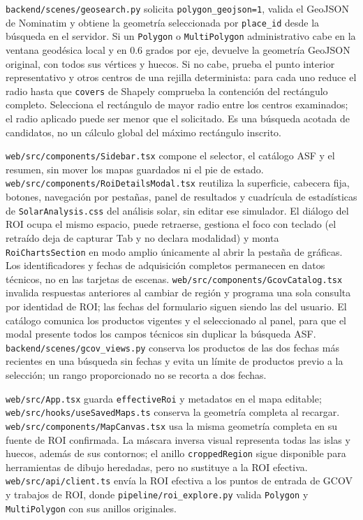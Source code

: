 \documentclass[11pt]{article}
\begin{document}
\texttt{backend/scenes/geosearch.py} solicita \texttt{polygon\_geojson=1}, valida el GeoJSON de Nominatim y obtiene la geometría seleccionada por \texttt{place\_id} desde la búsqueda en el servidor. Si un \texttt{Polygon} o \texttt{MultiPolygon} administrativo cabe en la ventana geodésica local y en 0.6 grados por eje, devuelve la geometría GeoJSON original, con todos sus vértices y huecos. Si no cabe, prueba el punto interior representativo y otros centros de una rejilla determinista: para cada uno reduce el radio hasta que \texttt{covers} de Shapely comprueba la contención del rectángulo completo. Selecciona el rectángulo de mayor radio entre los centros examinados; el radio aplicado puede ser menor que el solicitado. Es una búsqueda acotada de candidatos, no un cálculo global del máximo rectángulo inscrito.

\texttt{web/src/components/Sidebar.tsx} compone el selector, el catálogo ASF y el resumen, sin mover los mapas guardados ni el pie de estado. \texttt{web/src/components/RoiDetailsModal.tsx} reutiliza la superficie, cabecera fija, botones, navegación por pestañas, panel de resultados y cuadrícula de estadísticas de \texttt{SolarAnalysis.css} del análisis solar, sin editar ese simulador. El diálogo del ROI ocupa el mismo espacio, puede retraerse, gestiona el foco con teclado (el retraído deja de capturar Tab y no declara modalidad) y monta \texttt{RoiChartsSection} en modo amplio únicamente al abrir la pestaña de gráficas. Los identificadores y fechas de adquisición completos permanecen en datos técnicos, no en las tarjetas de escenas. \texttt{web/src/components/GcovCatalog.tsx} invalida respuestas anteriores al cambiar de región y programa una sola consulta por identidad de ROI; las fechas del formulario siguen siendo las del usuario. El catálogo comunica los productos vigentes y el seleccionado al panel, para que el modal presente todos los campos técnicos sin duplicar la búsqueda ASF. \texttt{backend/scenes/gcov\_views.py} conserva los productos de las dos fechas más recientes en una búsqueda sin fechas y evita un límite de productos previo a la selección; un rango proporcionado no se recorta a dos fechas.

\texttt{web/src/App.tsx} guarda \texttt{effectiveRoi} y metadatos en el mapa editable; \texttt{web/src/hooks/useSavedMaps.ts} conserva la geometría completa al recargar. \texttt{web/src/components/MapCanvas.tsx} usa la misma geometría completa en su fuente de ROI confirmada. La máscara inversa visual representa todas las islas y huecos, además de sus contornos; el anillo \texttt{croppedRegion} sigue disponible para herramientas de dibujo heredadas, pero no sustituye a la ROI efectiva. \texttt{web/src/api/client.ts} envía la ROI efectiva a los puntos de entrada de GCOV y trabajos de ROI, donde \texttt{pipeline/roi\_explore.py} valida \texttt{Polygon} y \texttt{MultiPolygon} con sus anillos originales.
\end{document}
